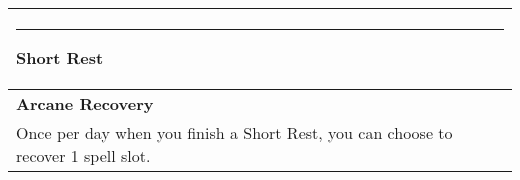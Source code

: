 \documentclass[twocolumn]{article}
\begin{document}
\\
\noindent\begin{tabular}{|m{3.1in}|}
\hline
\rule{.75in}{0pt}Short Rest\\
\hline
\textbf{Arcane Recovery}\\
Once per day when you finish a Short Rest, you can choose to recover 1 spell slot.\\
\hline
\end{tabular}
\end{document}
